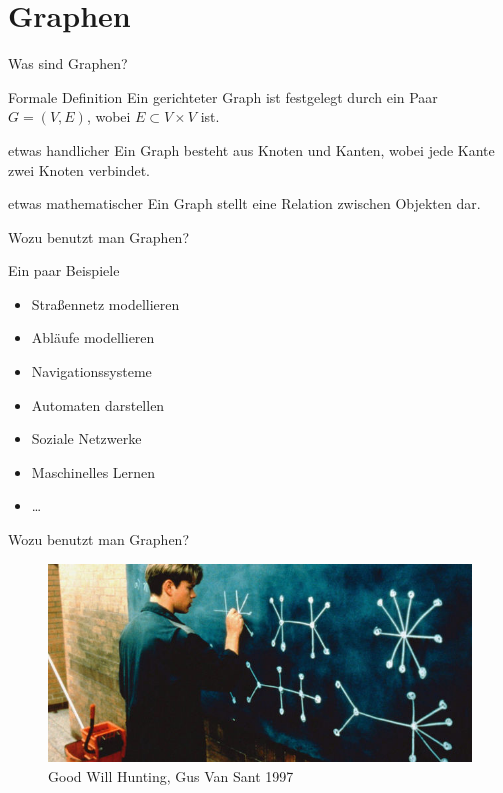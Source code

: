 \documentclass[18pt]{beamer}
\begin{document}
\section{Graphen}
    \begin{frame}{Was sind Graphen?}
        \begin{block}{Formale Definition}
            \glqq Ein gerichteter Graph ist festgelegt durch ein Paar $G = (V, E)$, wobei $E \subset V \times V$ ist\grqq \cite{worsch2016}.
        \end{block}
        \pause
        \begin{block}{etwas handlicher}
            Ein Graph besteht aus Knoten und Kanten, wobei jede Kante zwei Knoten verbindet.
        \end{block}
        \pause
        \begin{block}{etwas mathematischer}
            Ein Graph stellt eine Relation zwischen Objekten dar.
        \end{block}
    \end{frame}

    \begin{frame}{Wozu benutzt man Graphen?}
        \begin{block}{Ein paar Beispiele}
            \begin{itemize}[<+->]
                \item Straßennetz modellieren
                \item Abläufe modellieren
                \item Navigationssysteme
                \item Automaten darstellen
                \item Soziale Netzwerke
                \item Maschinelles Lernen
                \item \dots
            \end{itemize}
        \end{block}
    \end{frame}

    \begin{frame}{Wozu benutzt man Graphen?}
        \begin{figure}[]
            \centering
            \includegraphics[keepaspectratio,width=\textwidth]{logos/GoodWillHunting.jpg}
            \caption{Good Will Hunting, Gus Van Sant 1997}
        \end{figure}
    \end{frame}
\end{document}
